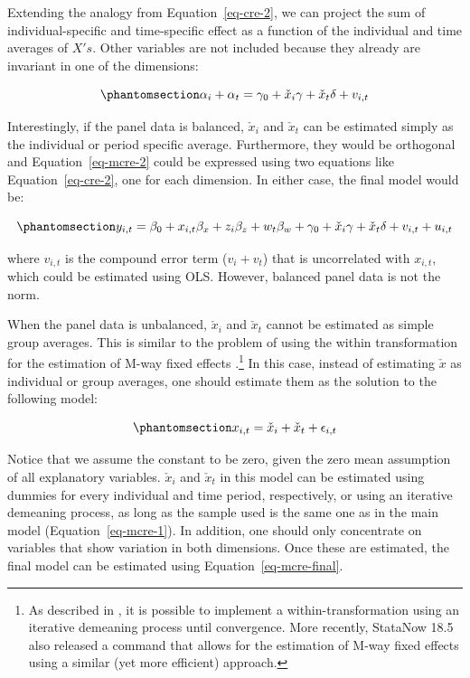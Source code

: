 \documentclass[bib]{statapress}
\begin{document}
Extending the analogy from Equation~\ref{eq-cre-2}, we can project the
sum of individual-specific and time-specific effect as a function of the
individual and time averages of \(X's\). Other variables are not
included because they already are invariant in one of the dimensions:

\begin{equation}\phantomsection\label{eq-mcre-2}{
\alpha_i + \alpha_t  = \gamma_0 + \check x_{i}\gamma + \check x_{t}\delta + v_{i,t}
}\end{equation}

Interestingly, if the panel data is balanced, \(\check x_{i}\) and
\(\check x_{t}\) can be estimated simply as the individual or period
specific average. Furthermore, they would be orthogonal and
Equation~\ref{eq-mcre-2} could be expressed using two equations like
Equation~\ref{eq-cre-2}, one for each dimension. In either case, the
final model would be:

\begin{equation}\phantomsection\label{eq-mcre-final}{y_{i,t} = \beta_0 + x_{i,t}\beta_x + z_{i}\beta_z + w_{t}\beta_w + \gamma_0 + \check x_{i}\gamma + \check x_{t}\delta+ v_{i,t} + u_{i,t}
}\end{equation}

where \(v_{i,t}\) is the compound error term (\(v_{i}+v_{t}\)) that is
uncorrelated with \(x_{i,t}\), which could be estimated using OLS.
However, balanced panel data is not the norm.

When the panel data is unbalanced, \(\check x_{i}\) and \(\check x_{t}\)
cannot be estimated as simple group averages. This is similar to the
problem of using the within transformation for the estimation of M-way
fixed effects \citep{rios2015, correia_2016}.\footnote{As described in
  \citet{rios2015}, it is possible to implement a within-transformation
  using an iterative demeaning process until convergence. More recently,
  StataNow 18.5 also released a command that allows for the estimation
  of M-way fixed effects using a similar (yet more efficient) approach.}
In this case, instead of estimating \(\check x\) as individual or group
averages, one should estimate them as the solution to the following
model:

\begin{equation}\phantomsection\label{eq-mcre-3}{x_{i,t} = \check x_{i} + \check x_{t} + \epsilon_{i,t}
}\end{equation}

Notice that we assume the constant to be zero, given the zero mean
assumption of all explanatory variables. \(\check x_{i}\) and
\(\check x_{t}\) in this model can be estimated using dummies for every
individual and time period, respectively, or using an iterative
demeaning process, as long as the sample used is the same one as in the
main model (Equation~\ref{eq-mcre-1}). In addition, one should only
concentrate on variables that show variation in both dimensions. Once
these are estimated, the final model can be estimated using
Equation~\ref{eq-mcre-final}.
\end{document}
